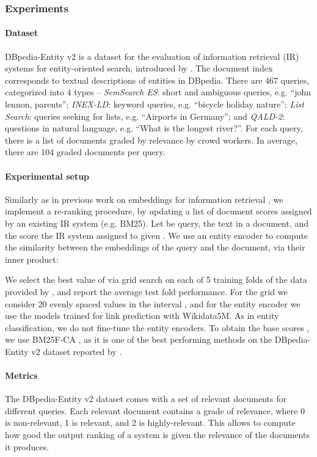 \documentclass[sigconf]{acmart}
\begin{document}
\subsubsection{Experiments}

\paragraph{Dataset} DBpedia-Entity v2 is a dataset for the evaluation of information retrieval (IR) systems for entity-oriented search, introduced by \citet{hasibi2017dbpediaent}. The document index corresponds to textual descriptions of entities in DBpedia. There are 467 queries, categorized into 4 types -- \textit{SemSearch ES}: short and ambiguous queries, e.g. ``john lennon, parents''; \textit{INEX-LD}: keyword queries, e.g. ``bicycle holiday nature''; \textit{List Search}: queries seeking for lists, e.g. ``Airports in Germany''; and \textit{QALD-2}: questions in natural language, e.g. ``What is the longest river?''. For each query, there is a list of documents graded by relevance by crowd workers. In average, there are 104 graded documents per query.

\paragraph{Experimental setup} Similarly as in previous work on embeddings for information retrieval \citep{gerritse2020graph}, we implement a re-ranking procedure, by updating a list of document scores assigned by an existing IR system (e.g. BM25). Let  be query,  the text in a document, and  the score the IR system assigned to  given . We use an entity encoder  to compute the similarity between the embeddings of the query and the document, via their inner product:

We select the best value of  via grid search on each of 5 training folds of the data provided by \citet{hasibi2017dbpediaent}, and report the average test fold performance. For the grid we consider 20 evenly spaced values in the interval , and for the entity encoder we use the models trained for link prediction with Wikidata5M. As in entity classification, we do not fine-tune the entity encoders. To obtain the base scores , we use BM25F-CA \citep{stephen2009bm25f}, as it is one of the best performing methods on the DBpedia-Entity v2 dataset reported by \citet{zhiltsov2015fsdm}.

\paragraph{Metrics} The DBpedia-Entity v2 dataset comes with a set of relevant documents for different queries. Each relevant document contains a grade of relevance, where 0 is non-relevant, 1 is relevant, and 2 is highly-relevant. This allows to compute how good the output ranking of a system is given the relevance of the documents it produces.
\end{document}
